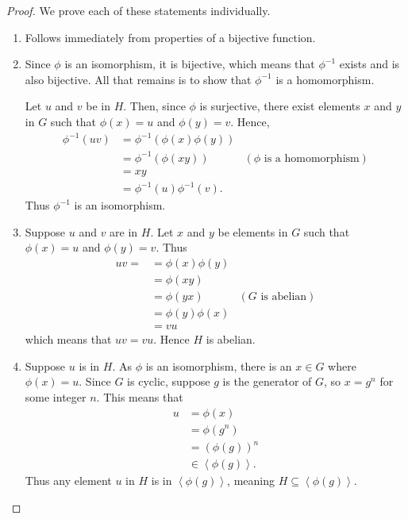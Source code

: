 \begin{proof}
    We prove each of these statements individually.
    \begin{enumerate}
        \item Follows immediately from properties of a bijective function.

        \item Since $\phi$ is an isomorphism, it is bijective, which means that $\phi^{-1}$ exists and is also bijective. All that remains is to show that $\phi^{-1}$ is a homomorphism.

        Let $u$ and $v$ be in $H$. Then, since $\phi$ is surjective, there exist elements $x$ and $y$ in $G$ such that $\phi(x) = u$ and $\phi(y) = v$. Hence,
        \begin{align*}
            \phi^{-1}(uv) &= \phi^{-1}\left(\phi(x)\phi(y)\right)\\
            &= \phi^{-1}\left(\phi(xy)\right) & (\phi \text{ is a homomorphism})\\
            &= xy\\
            &= \phi^{-1}(u) \phi^{-1}(v).
        \end{align*}
        Thus $\phi^{-1}$ is an isomorphism.
        
        \item Suppose $u$ and $v$ are in $H$. Let $x$ and $y$ be elements in $G$ such that $\phi(x) = u$ and $\phi(y) = v$. Thus
        \begin{align*}
            uv = &= \phi(x)\phi(y) \\
            &= \phi(xy)\\
            &= \phi(yx) & (G \text{ is abelian})\\
            &= \phi(y)\phi(x)\\
            &= vu
        \end{align*}
        which means that $uv = vu$. Hence $H$ is abelian.

        \item Suppose $u$ is in $H$. As $\phi$ is an isomorphism, there is an $x \in G$ where $\phi(x) = u$. Since $G$ is cyclic, suppose $g$ is the generator of $G$, so $x = g^n$ for some integer $n$. This means that
        \begin{align*}
            u &= \phi(x)\\
            &= \phi(g^n)\\
            &= \left(\phi(g)\right)^n\\
            &\in \left\langle \phi(g) \right\rangle.
        \end{align*}
        Thus any element $u$ in $H$ is in $\left\langle \phi(g) \right\rangle$, meaning $H \subseteq \left\langle \phi(g) \right\rangle$.


\end{enumerate}
\end{proof}

